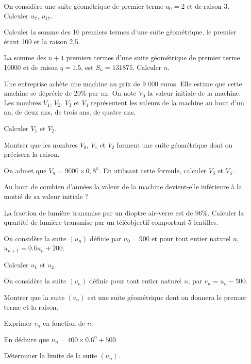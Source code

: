 \documentclass[a4paper,12pt]{scrartcl}
\begin{document}

\question{}
On considère une suite géométrique de premier terme $u_0 = 2$ et de raison 3. Calculer $u_7$, $u_{17}$.

\question{}
Calculer la somme des 10 premiers termes d'une suite géométrique, le premier étant 100 et la raison 2,5.

\question{}
La somme des $n+1$ premiers termes d'une suite géométrique de premier terme 10000 et de raison $q = 1.5$, est $S_n = 131 875$. Calculer $n$. 


\probleme[2]{}
Une entreprise achète une machine au prix de 9 000 euros. Elle estime que cette machine se déprécie de 20\% par an. On note $V_0$ la valeur initiale de la machine. Les nombres $V_1$, $V_2$, $V_3$ et $V_4$ représentent les valeurs de la machine au bout d'un an, de deux ans, de trois ans, de quatre ans.

\question{}
Calculer $V_1$ et $V_2$.

\question{}
Montrer que les nombres $V_0$, $V_1$ et $V_2$ forment une suite géométrique dont on précisera la raison.

\question{}
On admet que $V_n = 9000 \times 0,8^n$. En utilisant cette formule, calculer $V_3$ et $V_4$.

\question{}
Au bout de combien d'années la valeur de la machine devient-elle inférieure à la moitié de sa valeur initiale ?


\probleme[1]{}
La fraction de lumière transmise par un dioptre air-verre est de 96\%. Calculer la quantité de lumière transmise par un téléobjectif comportant 5 lentilles.


\probleme[2]{}

On considère la suite $(u_n)$ définie par $u_0 = 900$ et pour tout entier naturel $n$, $u_{n+1} = 0.6 u_n + 	200$.

\partie{}

\question{}
Calculer $u_1$ et $u_2$.

\question{}
On considère la suite $(v_n)$ définie  pour tout entier naturel $n$, par $v_n = u_n - 500$.

\subquestion{}
Montrer que la suite $(v_n)$ est une suite géométrique dont on donnera le premier terme et la raison.

\subquestion{}     
Exprimer $v_n$ en fonction de $n$.

\subquestion{}
En déduire que $u_n = 400 \times0.6^n + 500$.

\subquestion{}
Déterminer la limite de la suite $(u_n)$.
\end{document}
